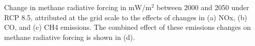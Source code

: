 Change in methane radiative forcing in $\mathrm{mW/m^2}$ between 2000 and 2050 under RCP 8.5, attributed at the grid scale to the effects of changes in (a) NOx, (b) CO, and (c) CH4 emissions. The combined effect of these emissions changes on methane radiative forcing is shown in (d).~\label{fig:drfcomb85}